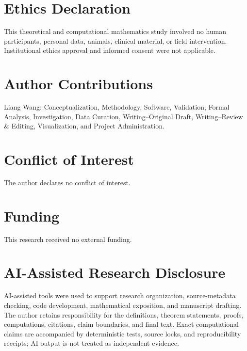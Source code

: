 \documentclass[11pt]{article}
\theoremstyle{definition}
\theoremstyle{remark}
\begin{document}
\section*{Ethics Declaration}
This theoretical and computational mathematics study involved no human participants, personal data, animals, clinical material, or field intervention. Institutional ethics approval and informed consent were not applicable.

\section*{Author Contributions}
Liang Wang: Conceptualization, Methodology, Software, Validation, Formal Analysis, Investigation, Data Curation, Writing--Original Draft, Writing--Review \& Editing, Visualization, and Project Administration.

\section*{Conflict of Interest}
The author declares no conflict of interest.

\section*{Funding}
This research received no external funding.

\section*{AI-Assisted Research Disclosure}
AI-assisted tools were used to support research organization, source-metadata checking, code development, mathematical exposition, and manuscript drafting. The author retains responsibility for the definitions, theorem statements, proofs, computations, citations, claim boundaries, and final text. Exact computational claims are accompanied by deterministic tests, source locks, and reproducibility receipts; AI output is not treated as independent evidence.

\begingroup
\raggedright


\endgroup
\end{document}
